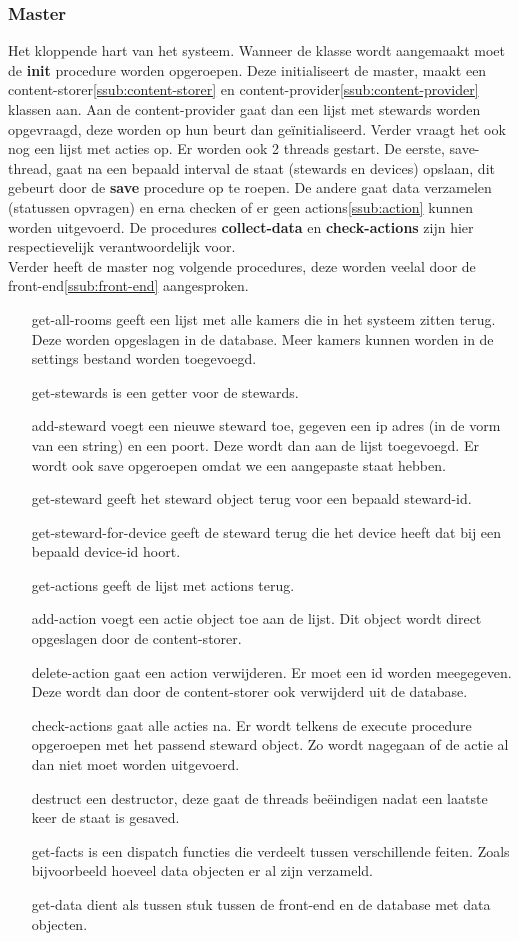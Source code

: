 \documentclass{article}
\begin{document}
\subsubsection{Master}
\label{ssub:master}
Het kloppende hart van het systeem. Wanneer de klasse wordt aangemaakt moet de \textbf{init} procedure worden opgeroepen. Deze initialiseert de master, maakt een content-storer\ref{ssub:content-storer} en content-provider\ref{ssub:content-provider} klassen aan. Aan de content-provider gaat dan een lijst met stewards worden opgevraagd, deze worden op hun beurt dan ge\"initialiseerd. Verder vraagt het ook nog een lijst met acties op. Er worden ook 2 threads gestart. De eerste, save-thread, gaat na een bepaald interval de staat (stewards en devices) opslaan, dit gebeurt door de \textbf{save} procedure op te roepen. De andere gaat data verzamelen (statussen opvragen) en erna checken of er geen actions\ref{ssub:action} kunnen worden uitgevoerd. De procedures \textbf{collect-data} en \textbf{check-actions} zijn hier respectievelijk verantwoordelijk voor.\\
Verder heeft de master nog volgende procedures, deze worden veelal door de front-end\ref{ssub:front-end} aangesproken.
\begin{itemize}
	\item[get-all-rooms] geeft een lijst met alle kamers die in het systeem zitten terug. Deze worden opgeslagen in de database. Meer kamers kunnen worden in de settings bestand worden toegevoegd.
	\item[get-stewards] is een getter voor de stewards.
	\item[add-steward] voegt een nieuwe steward toe, gegeven een ip adres (in de vorm van een string) en een poort. Deze wordt dan aan de lijst toegevoegd. Er wordt ook save opgeroepen omdat we een aangepaste staat hebben.
	\item[get-steward] geeft het steward object terug voor een bepaald steward-id.
	\item[get-steward-for-device] geeft de steward terug die het device heeft dat bij een bepaald device-id hoort.
	\item[get-actions] geeft de lijst met actions terug.
	\item[add-action] voegt een actie object toe aan de lijst. Dit object wordt direct opgeslagen door de content-storer.
	\item[delete-action] gaat een action verwijderen. Er moet een id worden meegegeven. Deze wordt dan door de content-storer ook verwijderd uit de database.
	\item[check-actions] gaat alle acties na. Er wordt telkens de execute procedure opgeroepen met het passend steward object. Zo wordt nagegaan of de actie al dan niet moet worden uitgevoerd.
	\item[destruct] een destructor, deze gaat de threads be\"eindigen nadat een laatste keer de staat is gesaved.
	\item[get-facts] is een dispatch functies die verdeelt tussen verschillende feiten. Zoals bijvoorbeeld hoeveel data objecten er al zijn verzameld.
	\item[get-data] dient als tussen stuk tussen de front-end en de database met data objecten. 
\end{itemize}
\end{document}
